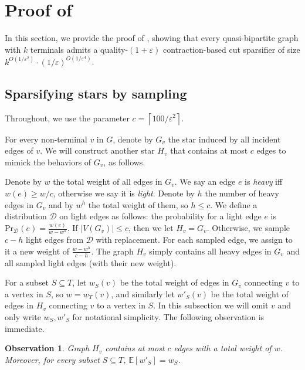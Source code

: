 \documentclass[11pt]{article}
\newtheorem{observation}[theorem]{Observation}
\theoremstyle{definition}
\newcommand{\dset}{{\mathcal{D}}}
\newcommand{\eps}{{\varepsilon}}
\def\ceil#1{\left\lceil #1 \right\rceil}
\def\ex#1{{\mathbb{E}}\left[ #1 \right]}
\newcounter{note}
\begin{document}
\section{Proof of }
\label{sec: quasi_apx}

In this section, we provide the proof of , showing that every quasi-bipartite graph with $k$ terminals admits a quality-$(1+\eps)$ contraction-based cut sparsifier of size $k^{O(1/\eps^2)}\cdot (1/\eps)^{O(1/\eps^4)}$. 






\subsection{Sparsifying stars by sampling}
\label{subsec: sparsified star}

Throughout, we use the parameter $c = \ceil{100/\eps^2}$. 

For every non-terminal $v$ in $G$, denote by $G_v$ the star induced by all incident edges of $v$. We will construct another star $H_v$ that contains at most $c$ edges to mimick the behaviors of $G_v$, as follows.

Denote by $w$ the total weight of all edges in $G_v$.
We say an edge $e$ is \emph{heavy} iff $w(e)\ge w/c$, otherwise we say it is \emph{light}.
Denote by $h$ the number of heavy edges in $G_v$ and by $w^h$ the total weight of them, so $h\le c$.
We define a distribution $\dset$ on light edges as follows: the probability for a light edge $e$ is 
$\text{Pr}_{\dset}(e)=\frac{w(e)}{w-w^h}.$
If $|V(G_v)|\le c$, then we let $H_v=G_v$.
Otherwise, we sample $c-h$ light edges from $\dset$ with replacement. For each sampled edge, we assign to it a new weight of $\frac{w-w^h}{c-h}$.
The graph $H_v$ simply contains all heavy edges in $G_v$ and all sampled light edges (with their new weight).

For a subset $S\subseteq T$, let $w_S(v)$ be the total weight of edges in $G_v$ connecting $v$ to a vertex in $S$, so $w=w_T(v)$, and similarly let $w'_S(v)$ be the total weight of edges in $H_v$ connecting $v$ to a vertex in $S$. 
In this subsection we will omit $v$ and only write $w_S,w'_S$ for notational simplicity.
The following observation is immediate.

\begin{observation}
\label{obs: property}
Graph $H_v$ contains at most $c$ edges with a total weight of $w$. Moreover, for every subset $S\subseteq T$, $\ex{w'_S}=w_S$.
\end{observation}
\end{document}
